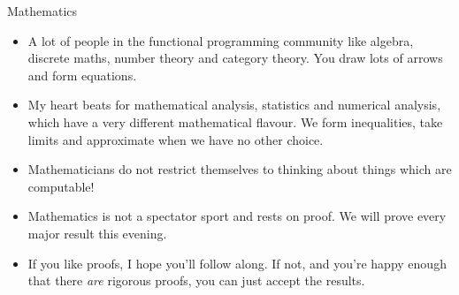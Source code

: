 \documentclass{beamer}
\begin{document}
\begin{frame}{Mathematics}
\begin{itemize}
\item A lot of people in the functional programming community like algebra, discrete maths, number theory and 
			category theory. You draw lots of arrows and form equations.
\item My heart beats for mathematical analysis, statistics and numerical analysis, which have a very 
			different mathematical flavour. We form inequalities, take limits and approximate when we have no other choice.
\item Mathematicians do not restrict themselves to thinking about things which are computable!
\item Mathematics is not a spectator sport and rests on proof. We will prove every major result this evening. 
\item If you like proofs, I hope you'll follow along. If not, and you're happy enough that there
			\emph{are} rigorous proofs, you can just accept the results.
\end{itemize}
\end{frame}





\end{document}
